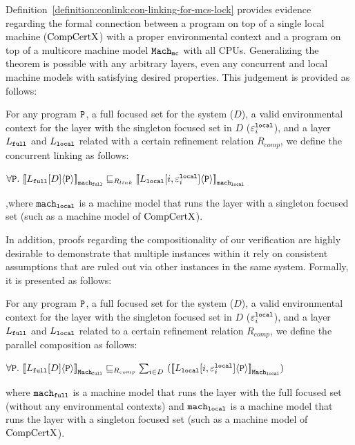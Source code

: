 Definition~\ref{definition:conlink:con-linking-for-mcs-lock} 
provides evidence regarding the formal connection between a program on top of a single local machine ($\mathrm{CompCertX}$) with a proper environmental context and a program on top of a multicore machine model ${{{{\mathrm{\texttt{Mach}}}}_{\mathrm{\texttt{mc}}}}}$ with all CPUs. 
Generalizing the theorem is possible with any arbitrary layers, even any concurrent and local machine models with satisfying desired properties. This judgement is provided as follows:
\begin{definition}
\label{definition:conlink:concurrent-linking}
For any program $ {\mathrm{\texttt{P}}}$, a full focused set for the system ($D$), a valid environmental context for the layer with the singleton focused set in $D$ (${\varepsilon}^{{\mathrm{\texttt{local}}}}_{i}$), and a layer $L_{{\mathrm{\texttt{full}}}}$ and $L_{{\mathrm{\texttt{local}}}}$ related with a certain 
refinement relation $R_{comp}$, we define the concurrent linking as follows:
\begin{center}
$\forall \codeinmath{P}. \ \semwmachine{L_{\codeinmath{full}}[D]}{\codeinmath{P}}{\codeinmath{mach}_{\codeinmath{full}}} \refines_{R_{link}} \semwmachine{\PLayer{L_{\codeinmath{local}}}{i}{\oracle^{\codeinmath{local}}_{i}}}{\codeinmath{P}}{\codeinmath{mach}_{\codeinmath{local}}}$
\end{center}
,where ${\mathrm{\texttt{mach}}}_{{\mathrm{\texttt{local}}}}$ is a machine model that runs the layer with a singleton focused set (such as a machine model of $\mathrm{CompCertX}$).
\end{definition}
{\noindent}
In addition, proofs regarding the compositionality of our verification are highly desirable to demonstrate that multiple instances within it rely on consistent assumptions that are ruled out via other instances in the same system. Formally, it is presented as follows:
\begin{definition}
\label{definition:conlink:parallel-composition}
For any program $ {\mathrm{\texttt{P}}}$, a full focused set for the system ($D$), a valid environmental context for the layer with the singleton focused set in $D$ (${\varepsilon}^{{\mathrm{\texttt{local}}}}_{i}$), and a layer $L_{{\mathrm{\texttt{full}}}}$ and $L_{{\mathrm{\texttt{local}}}}$ related to a certain 
refinement relation $R_{comp}$, we define the parallel composition as follows:
\begin{center}
$\forall \codeinmath{P}. \ \semwmachine{L_{\codeinmath{full}}[D]}{\codeinmath{P}}{\machkwd_{\codeinmath{full}}} \refines_{R_{comp}} \sum_{i \in D}\  (\semwmachine{\PLayer{L_{\codeinmath{local}}}{i}{\oracle^{\codeinmath{local}}_i}}{\codeinmath{P}}{\machkwd_{\codeinmath{local}}})$
\end{center}
where  ${\mathrm{\texttt{mach}}}_{{\mathrm{\texttt{full}}}}$ is a machine model that runs the layer with the full focused set (without any environmental contexts) and
${\mathrm{\texttt{mach}}}_{{\mathrm{\texttt{local}}}}$ is a machine model that runs the layer with a singleton focused set (such as a machine model of $\mathrm{CompCertX}$).
\end{definition}



